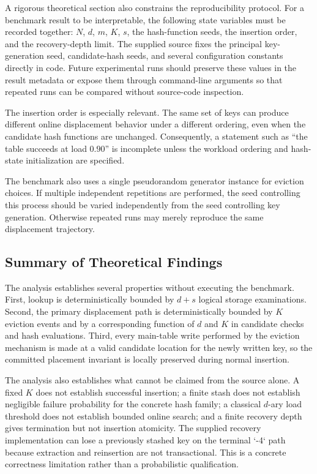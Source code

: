 \documentclass[conference]{IEEEtran}
\begin{document}
A rigorous theoretical section also constrains the reproducibility protocol. For a benchmark result to be interpretable, the following state variables must be recorded together: $N$, $d$, $m$, $K$, $s$, the hash-function seeds, the insertion order, and the recovery-depth limit. The supplied source fixes the principal key-generation seed, candidate-hash seeds, and several configuration constants directly in code. Future experimental runs should preserve these values in the result metadata or expose them through command-line arguments so that repeated runs can be compared without source-code inspection.

The insertion order is especially relevant. The same set of keys can produce different online displacement behavior under a different ordering, even when the candidate hash functions are unchanged. Consequently, a statement such as ``the table succeeds at load $0.90$'' is incomplete unless the workload ordering and hash-state initialization are specified.

The benchmark also uses a single pseudorandom generator instance for eviction choices. If multiple independent repetitions are performed, the seed controlling this process should be varied independently from the seed controlling key generation. Otherwise repeated runs may merely reproduce the same displacement trajectory.

\subsection{Summary of Theoretical Findings}

The analysis establishes several properties without executing the benchmark. First, lookup is deterministically bounded by $d+s$ logical storage examinations. Second, the primary displacement path is deterministically bounded by $K$ eviction events and by a corresponding function of $d$ and $K$ in candidate checks and hash evaluations. Third, every main-table write performed by the eviction mechanism is made at a valid candidate location for the newly written key, so the committed placement invariant is locally preserved during normal insertion.

The analysis also establishes what cannot be claimed from the source alone. A fixed $K$ does not establish successful insertion; a finite stash does not establish negligible failure probability for the concrete hash family; a classical $d$-ary load threshold does not establish bounded online search; and a finite recovery depth gives termination but not insertion atomicity. The supplied recovery implementation can lose a previously stashed key on the terminal `-4` path because extraction and reinsertion are not transactional. This is a concrete correctness limitation rather than a probabilistic qualification.
\end{document}
